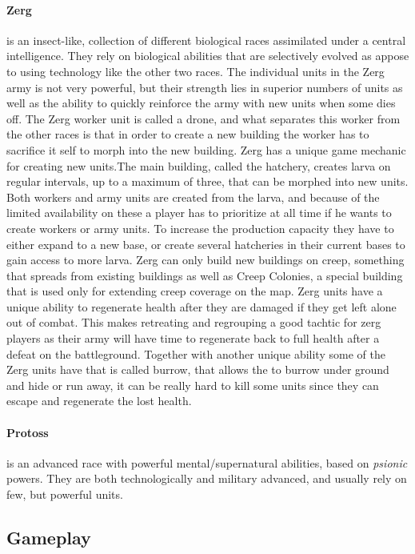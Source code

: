 \paragraph{Zerg} is an insect-like, collection of different biological races assimilated under a central intelligence. They rely on biological abilities that are selectively evolved as appose to using technology like the other two races. The individual units in the Zerg army is not very powerful, but their strength lies in superior numbers of units as well as the ability to quickly reinforce the army with new units when some dies off. The Zerg worker unit is called a drone, and what separates this worker from the other races is that in order to create a new building the worker has to sacrifice it self to morph into the new building. Zerg has a unique game mechanic for creating new units.The main building, called the hatchery, creates larva on regular intervals, up to a maximum of three, that can be morphed into new units. Both workers and army units are created from the larva, and because of the limited availability on these a player has to prioritize at all time if he wants to create workers or army units. To increase the production capacity they have to either expand to a new base, or create several hatcheries in their current bases to gain access to more larva. Zerg can only build new buildings on creep, something that spreads from existing buildings as well as Creep Colonies, a special building that is used only for extending creep coverage on the map. Zerg units have a unique ability to regenerate health after they are damaged if they get left alone out of combat. This makes retreating and regrouping a good tachtic for zerg players as their army will have time to regenerate back to full health after a defeat on the battleground. Together with another unique ability some of the Zerg units have that is called burrow, that allows the to burrow under ground and hide or run away, it can be really hard to kill some units since they can escape and regenerate the lost health. 

\paragraph{Protoss} is an advanced race with powerful mental/supernatural abilities, based on {\em psionic} powers. They are both technologically and military advanced, and usually rely on few, but powerful units.

\subsection{Gameplay}

